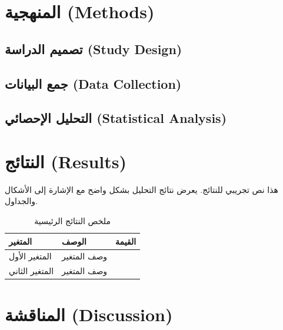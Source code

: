 \documentclass[11pt,a4paper]{article}
\begin{document}
\section{المنهجية (Methods)}
\label{sec:methods}

\subsection{تصميم الدراسة (Study Design)}

\subsection{جمع البيانات (Data Collection)}

\subsection{التحليل الإحصائي (Statistical Analysis)}

\section{النتائج (Results)}
\label{sec:results}

هذا نص تجريبي للنتائج. يعرض نتائج التحليل بشكل واضح مع الإشارة إلى الأشكال والجداول.

\begin{table}[H]
\centering
\caption{ملخص النتائج الرئيسية}
\begin{tabularx}{\textwidth}{L{4cm} X C{3cm}}
\toprule
\textbf{المتغير} & \textbf{الوصف} & \textbf{القيمة} \\
\midrule
المتغير الأول & وصف المتغير &  \\
المتغير الثاني & وصف المتغير &  \\
\bottomrule
\end{tabularx}
\end{table}


\section{المناقشة (Discussion)}
\label{sec:discussion}
\end{document}
